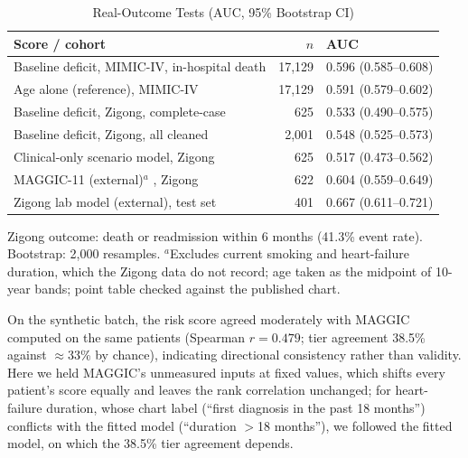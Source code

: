 \documentclass[conference]{IEEEtran}
\begin{document}
\begin{table}[!t]
\centering
\caption{Real-Outcome Tests (AUC, 95\% Bootstrap CI)}
\label{tab:auc}
\footnotesize
\begin{threeparttable}
\begin{tabularx}{\columnwidth}{@{}Yrl@{}}
\toprule
\textbf{Score / cohort} & \textbf{$n$} & \textbf{AUC} \\
\midrule
Baseline deficit, MIMIC-IV, in-hospital death & 17,129 & 0.596 (0.585--0.608) \\
Age alone (reference), MIMIC-IV & 17,129 & 0.591 (0.579--0.602) \\
Baseline deficit, Zigong, complete-case & 625 & 0.533 (0.490--0.575) \\
Baseline deficit, Zigong, all cleaned & 2,001 & 0.548 (0.525--0.573) \\
Clinical-only scenario model, Zigong & 625 & 0.517 (0.473--0.562) \\
MAGGIC-11 (external)$^{a}$ \cite{pocock2013maggic}, Zigong & 622 & 0.604 (0.559--0.649) \\
Zigong lab model (external), test set & 401 & 0.667 (0.611--0.721) \\
\bottomrule
\end{tabularx}
\begin{tablenotes}\footnotesize
\item Zigong outcome: death or readmission within 6 months (41.3\% event rate). Bootstrap: 2,000 resamples. $^{a}$Excludes current smoking and heart-failure duration, which the Zigong data do not record; age taken as the midpoint of 10-year bands; point table checked against the published chart.
\end{tablenotes}
\end{threeparttable}
\end{table}

On the synthetic batch, the risk score agreed moderately with MAGGIC computed on the same patients (Spearman $r=0.479$; tier agreement 38.5\% against $\approx$33\% by chance), indicating directional consistency rather than validity. Here we held MAGGIC's unmeasured inputs at fixed values, which shifts every patient's score equally and leaves the rank correlation unchanged; for heart-failure duration, whose chart label (``first diagnosis in the past 18 months'') conflicts with the fitted model (``duration $>$18 months''), we followed the fitted model, on which the 38.5\% tier agreement depends.

\end{document}
